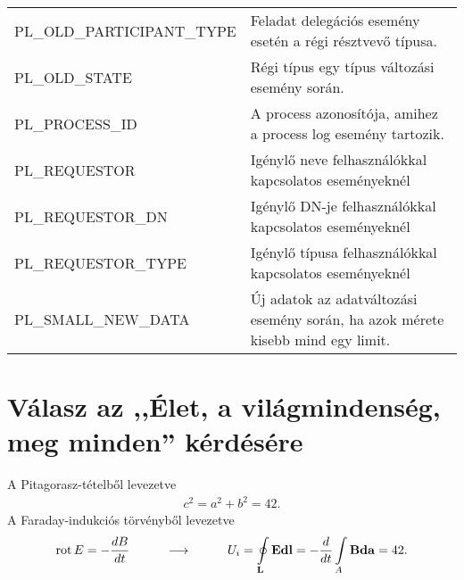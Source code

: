 \begin{table}[htbp]
\begin{tabular}{p{.20\linewidth}p{.80\linewidth}}
		PL\_OLD\_PARTICIPANT\_TYPE & Feladat delegációs esemény esetén a régi résztvevő típusa. \\
		PL\_OLD\_STATE & Régi típus egy típus változási esemény során. \\
		PL\_PROCESS\_ID & A process azonosítója, amihez a process log esemény tartozik. \\
		PL\_REQUESTOR & Igénylő neve felhasználókkal kapcsolatos eseményeknél \\
		PL\_REQUESTOR\_DN & Igénylő DN-je felhasználókkal kapcsolatos eseményeknél \\
		PL\_REQUESTOR\_TYPE & Igénylő típusa felhasználókkal kapcsolatos eseményeknél \\
		PL\_SMALL\_NEW\_DATA & Új adatok az adatváltozási esemény során, ha azok mérete kisebb mind egy limit. \\
	\end{tabular}%
	\label{tab:allprops}%
\end{table}%

\clearpage\section{Válasz az ,,Élet, a világmindenség, meg minden'' kérdésére}
A Pitagorasz-tételből levezetve
\begin{align}
c^2=a^2+b^2=42.
\end{align}
A Faraday-indukciós törvényből levezetve
\begin{align}
\operatorname{rot} E=-\frac{dB}{dt}\hspace{1cm}\longrightarrow \hspace{1cm}
U_i=\oint\limits_\mathbf{L}{\mathbf{E}\mathbf{dl}}=-\frac{d}{dt}\int\limits_A{\mathbf{B}\mathbf{da}}=42.
\end{align}
